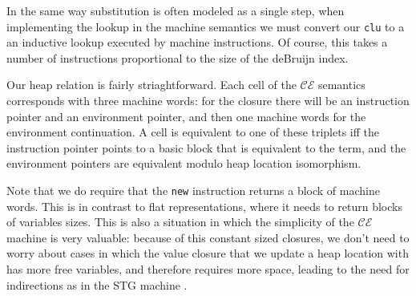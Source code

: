 In the same way substitution is often modeled as a single step, when
implementing the lookup in the machine semantics we must convert our
\texttt{clu} to a an inductive lookup executed by machine instructions. Of
course, this takes a number of instructions proportional to the size of the
deBruijn index. 

Our heap relation is fairly striaghtforward. Each cell of the $\mathcal{CE}$
semantics corresponds with three machine words: for the closure there will be an
instruction pointer and an environment pointer, and then one machine words for
the environment continuation. A cell is equivalent to one of these triplets iff
the instruction pointer points to a basic block that is equivalent to the term,
and the environment pointers are equivalent modulo heap location isomorphism.

Note that we do require that the \texttt{new} instruction returns a block of
machine words. This is in contrast to flat representations, where it needs to
return blocks of variables sizes. This is also a situation in which the
simplicity of the $\mathcal{CE}$ machine is very valuable: because of this
constant sized closures, we don't need to worry about cases in which the
value closure that we update a heap location with has more free variables, and
therefore requires more space, leading to the need for indirections as in the
STG machine \cite{STG}.


